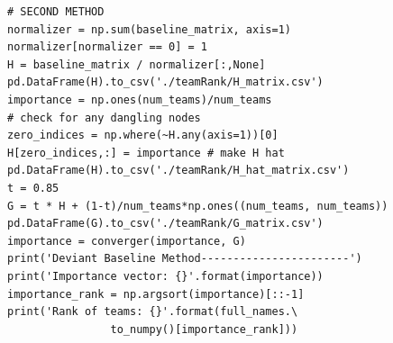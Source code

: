 \documentclass[12pt]{article}%
\begin{document}
\begin{lstlisting}
# SECOND METHOD
normalizer = np.sum(baseline_matrix, axis=1)
normalizer[normalizer == 0] = 1
H = baseline_matrix / normalizer[:,None]
pd.DataFrame(H).to_csv('./teamRank/H_matrix.csv')
importance = np.ones(num_teams)/num_teams
# check for any dangling nodes
zero_indices = np.where(~H.any(axis=1))[0]
H[zero_indices,:] = importance # make H hat
pd.DataFrame(H).to_csv('./teamRank/H_hat_matrix.csv')
t = 0.85
G = t * H + (1-t)/num_teams*np.ones((num_teams, num_teams))
pd.DataFrame(G).to_csv('./teamRank/G_matrix.csv')
importance = converger(importance, G)
print('Deviant Baseline Method-----------------------')
print('Importance vector: {}'.format(importance))
importance_rank = np.argsort(importance)[::-1]
print('Rank of teams: {}'.format(full_names.\
				to_numpy()[importance_rank]))

\end{lstlisting}
\end{document}

